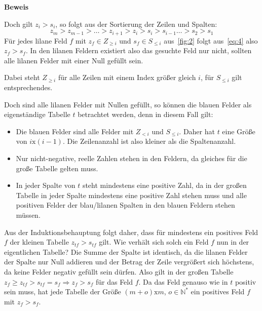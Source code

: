 \documentclass[10pt, a4paper, reqno]{amsart}
\makeatletter
\renewcommand\proofname{Beweis}
\renewenvironment{proof}[1][\proofname]{\par
\pushQED{\qed}%
\normalfont \topsep6\p@\@plus6\p@\relax
\trivlist
\item\relax
{\bfseries#1}\hspace\labelsep\ignorespaces
}{%
\popQED\endtrivlist\@endpefalse
}
\makeatother
\begin{document}
\begin{proof}
\begin{itemize}[itemsep=2ex]
    Doch gilt $z_i>s_i$, so folgt aus der Sortierung der Zeilen und Spalten:
    \begin{equation}
      z_m>z_{m-1}>\ldots>z_{i+1}>z_i>s_i>s_{i-1}\ldots>s_2>s_1
      \label{eq:4}
    \end{equation}
    Für jedes lilane Feld $f$ mit $z_f∈Z_{\geq i}$ und $s_f∈S_{\leq i}$
    aus~\autoref{fig:2} folgt aus~\eqref{eq:4} also $z_f>s_f$. In den lilanen
    Feldern existiert also das gesuchte Feld nur nicht, sollten alle lilanen
    Felder mit einer Null gefüllt sein.

    Dabei steht $Z_{\geq i}$ für alle Zeilen mit einem Index größer gleich $i$,
    für $S_{\leq i}$ gilt entsprechendes.

    Doch sind alle lilanen Felder mit Nullen gefüllt, so können die blauen Felder als eigenständige Tabelle $t$
    betrachtet werden, denn in diesem Fall gilt:
    \begin{itemize}
    \item Die blauen Felder sind alle Felder mit $Z_{<i}$ und $S_{\leq i}$. Daher
      hat $t$ eine Größe von $i\text{x}(i-1)$. Die Zeilenanzahl ist also kleiner
      als die Spaltenanzahl.
    \item Nur nicht-negative, reelle Zahlen stehen in den Feldern, da gleiches
      für die große Tabelle gelten muss.
    \item In jeder Spalte von $t$ steht mindestens eine positive Zahl, da in der
      großen Tabelle in jeder Spalte mindestens eine positive Zahl stehen muss
      und alle positiven Felder der blau/lilanen Spalten in den blauen Feldern
      stehen müssen.
    \end{itemize}
    Aus der Induktionsbehauptung folgt daher, dass für mindestens ein positives
    Feld $f$ der kleinen Tabelle $z_{tf}>s_{tf}$ gilt. Wie verhält sich solch
    ein Feld $f$ nun in der eigentlichen Tabelle? Die Summe der Spalte ist
    identisch, da die lilanen Felder der Spalte nur Null addieren und der Betrag
    der Zeile vergrößert sich höchstens, da keine Felder negativ gefüllt sein
    dürfen. Also gilt in der großen Tabelle $z_f \geq
    z_{tf}>s_{tf}=s_f\Rightarrow z_f > s_f$ für das Feld $f$. Da das Feld
    genauso wie in $t$ positiv sein muss, hat jede Tabelle der Größe
    $(m+o)\text{x}m$, $o∈ℕ^*$ ein
    positives Feld $f$ mit $z_f>s_f$.
  \end{itemize}
\end{proof}
\end{document}
